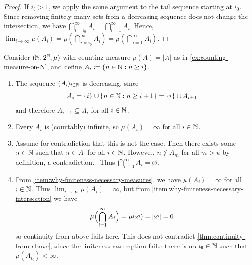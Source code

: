 \begin{proof}
If $i_0>1$, we apply the same argument to the tail sequence starting at $i_0$.
Since removing finitely many sets from a decreasing sequence does not change the intersection, we have
\(
\bigcap_{i=i_0}^{\infty} A_i
=
\bigcap_{i=1}^{\infty} A_i
\).
Hence,
\(
\lim_{i \to \infty} \mu(A_i)
=
\mu(\bigcap_{i=i_0}^{\infty} A_i)
=
\mu(\bigcap_{i=1}^{\infty} A_i)
\).
\end{proof}

\begin{example}\label{ex:finiteness-necessary-continuity-from-above} %
Consider $(\mathbb{N},2^{\mathbb{N}},\mu)$ with counting measure $\mu(A)\allowbreak=\allowbreak|A|$ as in \autoref{ex:counting-measure-on-N}, and define
\(
A_i \coloneq \{n\in\mathbb{N} : n \ge i\}
\).
\begin{enumerate}[label=(\alph*)]
\item\label{item:why-finiteness-necessary-decreasing}
The sequence $(A_i)_{i\in\mathbb{N}}$ is decreasing, since
\[
A_i 
= 
\{i\} \cup \{n\in\mathbb{N} : n \ge i+1\}
=
\{i\} \cup A_{i+1}
\]
and therefore
\(
A_{i+1} \subseteq A_i
\)
for all
$i\in\mathbb{N}$.

\item\label{item:why-finiteness-necessary-measures}
Every $A_i$ is (countably) infinite, so $\mu(A_i)=\infty$ for all $i \in \mathbb{N}$.


\item\label{item:why-finiteness-necessary-intersection}
Assume for contradiction that this is not the case. 
Then there exists some $n \in \mathbb{N}$ such that $n \in A_i$ for all $i \in \mathbb{N}$. 
However, $n \notin A_m$ for all $m > n$ by definition, a contradiction.~\contradiction{}
Thus $\bigcap_{i=1}^{\infty} A_i = \varnothing$.

\item
From \hyperref[item:why-finiteness-necessary-measures]{\ref*{item:why-finiteness-necessary-measures}}, we have $\mu(A_i)=\infty$ for all $i \in \mathbb{N}$. 
Thus $\lim_{i\to\infty} \mu(A_i)=\infty$, but from \hyperref[item:why-finiteness-necessary-intersection]{\ref*{item:why-finiteness-necessary-intersection}} we have
\[
\mu\Bigl(\bigcap_{i=1}^{\infty} A_i\Bigr)=\mu(\varnothing)=|\varnothing|=0
\]
so continuity from above fails here. 
This does not contradict \autoref{thm:continuity-from-above}, since the finiteness assumption fails: 
there is no $i_0 \in \mathbb{N}$ such that $\mu(A_{i_0})<\infty$.
\qedhere
\end{enumerate}
\end{example}



